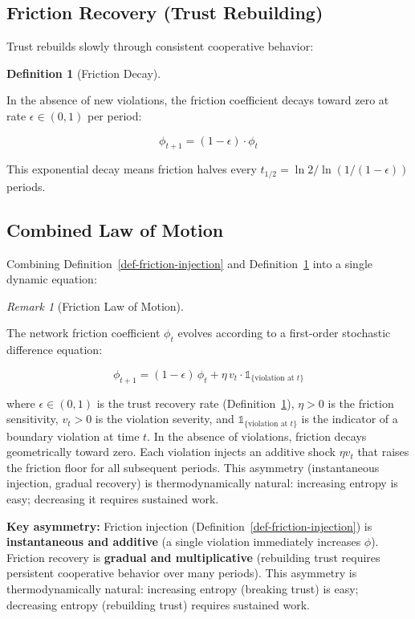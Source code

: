 \documentclass[11pt]{article}
\theoremstyle{plain}
\theoremstyle{definition}
\newtheorem{definition}{Definition}
\theoremstyle{remark}
\newtheorem{remark}{Remark}
\let\origsubsection\subsection
\renewcommand{\subsection}{\needspace{7\baselineskip}\origsubsection}
\begin{document}
\subsection{Friction Recovery (Trust
Rebuilding)}\label{friction-recovery-trust-rebuilding}

Trust rebuilds slowly through consistent cooperative behavior:

\begin{definition}[Friction Decay]
\label{def-friction-decay}

In the absence of new violations, the friction coefficient decays toward zero at rate $\epsilon \in (0, 1)$ per period:

$$\phi_{t+1} = (1 - \epsilon) \cdot \phi_t$$

This exponential decay means friction halves every $t_{1/2} = \ln 2 / \ln(1/(1 - \epsilon))$ periods.
\end{definition}

\subsection{Combined Law of Motion}\label{combined-law-of-motion}

Combining Definition~\ref{def-friction-injection} and
Definition~\ref{def-friction-decay} into a single dynamic equation:

\begin{remark}[Friction Law of Motion]
\label{rmk-friction-law-of-motion}

The network friction coefficient $\phi_t$ evolves according to a first-order stochastic difference equation:

$$\phi_{t+1} = (1 - \epsilon)\,\phi_t + \eta\,v_t \cdot \mathds{1}_{\{\text{violation at } t\}}$$

where $\epsilon \in (0,1)$ is the trust recovery rate (Definition~\ref{def-friction-decay}), $\eta > 0$ is the friction sensitivity, $v_t > 0$ is the violation severity, and $\mathds{1}_{\{\text{violation at } t\}}$ is the indicator of a boundary violation at time $t$. In the absence of violations, friction decays geometrically toward zero. Each violation injects an additive shock $\eta v_t$ that raises the friction floor for all subsequent periods. This asymmetry (instantaneous injection, gradual recovery) is thermodynamically natural: increasing entropy is easy; decreasing it requires sustained work.
\end{remark}

\textbf{Key asymmetry:} Friction injection
(Definition~\ref{def-friction-injection}) is \textbf{instantaneous and
additive} (a single violation immediately increases \(\phi\)). Friction
recovery is \textbf{gradual and multiplicative} (rebuilding trust
requires persistent cooperative behavior over many periods). This
asymmetry is thermodynamically natural: increasing entropy (breaking
trust) is easy; decreasing entropy (rebuilding trust) requires sustained
work.
\end{document}
